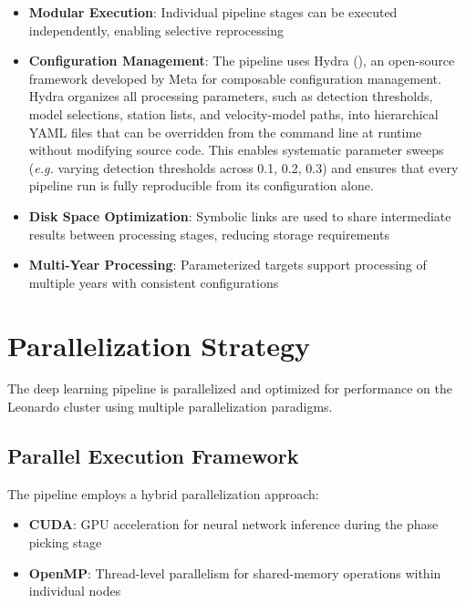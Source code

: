 \begin{itemize}
  \item \textbf{Modular Execution}: Individual pipeline stages can be executed
    independently, enabling selective reprocessing

  \item \textbf{Configuration Management}: The pipeline uses Hydra
    (\cite{Hydra}), an open-source framework developed by Meta for composable
    configuration management. Hydra organizes all processing
    parameters, such as
    detection thresholds, model selections, station lists, and velocity-model
    paths, into hierarchical YAML files that can be overridden from the command
    line at runtime without modifying source code. This enables systematic
    parameter sweeps (\textit{e.g.} varying detection thresholds
      across 0.1, 0.2,
    0.3) and ensures that every pipeline run is fully reproducible from its
    configuration alone.

  \item \textbf{Disk Space Optimization}: Symbolic links are used to share
    intermediate results between processing stages, reducing storage
    requirements

  \item \textbf{Multi-Year Processing}: Parameterized targets support
    processing of multiple years with consistent configurations
\end{itemize}

\section{Parallelization Strategy}

The deep learning pipeline is parallelized and optimized for performance on the
Leonardo cluster using multiple parallelization paradigms.

\subsection{Parallel Execution Framework}
The pipeline employs a hybrid parallelization approach:

\begin{itemize}
  \item \textbf{CUDA}: GPU acceleration for neural network inference during the
    phase picking stage

  \item \textbf{OpenMP}: Thread-level parallelism for shared-memory operations
    within individual nodes
\end{itemize}

